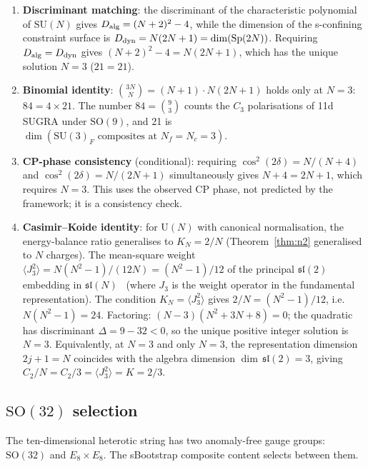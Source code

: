\documentclass[12pt,a4paper]{article}
\newcommand{\SU}{\mathrm{SU}}
\newcommand{\UU}{\mathrm{U}}
\newcommand{\SO}{\mathrm{SO}}
\newcommand{\Sp}{\mathrm{Sp}}
\newcommand{\Nf}{N_{\!f}}
\newcommand{\Nc}{N_{\!c}}
\begin{document}
\begin{enumerate}
  \item \textbf{Discriminant matching}:
    the discriminant of the characteristic polynomial of $\SU(N)$
    gives $D_{\rm alg} = (N+2)^2 - 4$, while the dimension of
    the s-confining constraint surface is $D_{\rm dyn} = N(2N+1)
    = \dim(\Sp(2N))$.
    Requiring $D_{\rm alg} = D_{\rm dyn}$ gives
    $(N+2)^2 - 4 = N(2N+1)$, which has the unique solution
    $N = 3$ ($21 = 21$).

  \item \textbf{Binomial identity}:
    $\binom{3N}{N} = (N+1) \cdot N(2N+1)$ holds only at $N = 3$:
    $84 = 4 \times 21$.
    The number $84 = \binom{9}{3}$ counts the $C_3$ polarisations
    of 11d SUGRA under $\SO(9)$, and 21 is
    $\dim(\SU(3)_F \text{ composites at } \Nf = \Nc = 3)$.

  \item \textbf{CP-phase consistency} (conditional):
    requiring $\cos^2(2\delta) = N/(N+4)$ and
    $\cos^2(2\delta) = N/(2N+1)$ simultaneously gives
    $N + 4 = 2N + 1$, which requires $N = 3$.
    This uses the observed CP phase, not predicted by the
    framework; it is a consistency check.

  \item \textbf{Casimir--Koide identity}:
    for $\UU(N)$ with canonical normalisation, the energy-balance
    ratio generalises to $K_N = 2/N$ (Theorem~\ref{thm:n2}
    generalised to $N$ charges).
    The mean-square weight $\langle J_3^2\rangle
    = N(N^2-1)/(12N) = (N^2-1)/12$ of the principal
    $\mathfrak{sl}(2)$ embedding in
    $\mathfrak{sl}(N)$~\cite{Kostant:1959}
    (where $J_3$ is the weight operator in the fundamental
    representation).
    The condition $K_N = \langle J_3^2\rangle$ gives
    $2/N = (N^2-1)/12$, i.e.\ $N(N^2-1) = 24$.
    Factoring: $(N-3)(N^2+3N+8) = 0$; the quadratic has
    discriminant $\Delta = 9 - 32 < 0$, so the unique positive
    integer solution is $N = 3$.
    Equivalently, at $N = 3$ and only $N = 3$, the representation
    dimension $2j + 1 = N$ coincides with the algebra dimension
    $\dim\,\mathfrak{sl}(2) = 3$, giving
    $C_2/N = C_2/3 = \langle J_3^2\rangle = K = 2/3$.
\end{enumerate}

\subsection{$\SO(32)$ selection}

The ten-dimensional heterotic string has two anomaly-free gauge
groups: $\SO(32)$ and $E_8 \times E_8$.
The sBootstrap composite content selects between them.
\end{document}
